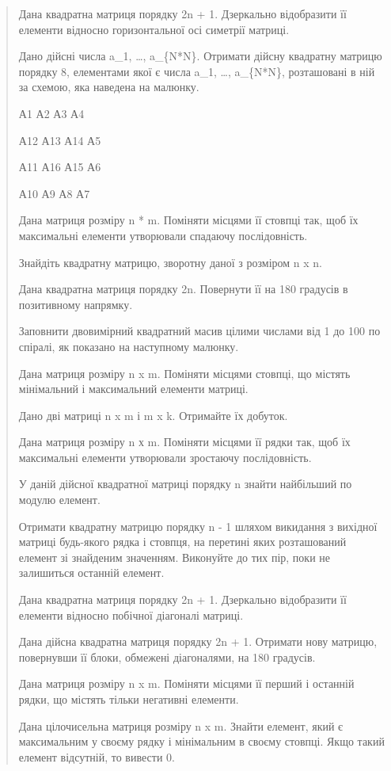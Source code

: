 \documentclass[]{article}
\begin{document}
\begin{quote}
Дана квадратна матриця порядку 2n + 1. Дзеркально відобразити її
елементи відносно горизонтальної осі симетрії матриці.

Дано дійсні числа a\_1, \ldots{}, a\_\{N*N\}. Отримати дійсну квадратну
матрицю порядку 8, елементами якої є числа a\_1, \ldots{}, a\_\{N*N\},
розташовані в ній за схемою, яка наведена на малюнку.

А1 А2 А3 А4

А12 А13 А14 А5

А11 А16 А15 А6

А10 А9 А8 А7

Дана матриця розміру n * m. Поміняти місцями її стовпці так, щоб їх
максимальні елементи утворювали спадаючу послідовність.

Знайдіть квадратну матрицю, зворотну даної з розміром n x n.

Дана квадратна матриця порядку 2n. Повернути її на 180 градусів в
позитивному напрямку.

Заповнити двовимірний квадратний масив цілими числами від 1 до 100 по
спіралі, як показано на наступному малюнку.

Дана матриця розміру n x m. Поміняти місцями стовпці, що містять
мінімальний і максимальний елементи матриці.

Дано дві матриці n x m і m x k. Отримайте їх добуток.

Дана матриця розміру n х m. Поміняти місцями її рядки так, щоб їх
максимальні елементи утворювали зростаючу послідовність.

У даній дійсної квадратної матриці порядку n знайти найбільший по модулю
елемент.

Отримати квадратну матрицю порядку n - 1 шляхом викидання з вихідної
матриці будь-якого рядка і стовпця, на перетині яких розташований
елемент зі знайденим значенням. Виконуйте до тих пір, поки не залишиться
останній елемент.

Дана квадратна матриця порядку 2n + 1. Дзеркально відобразити її
елементи відносно побічної діагоналі матриці.

Дана дійсна квадратна матриця порядку 2n + 1. Отримати нову матрицю,
повернувши її блоки, обмежені діагоналями, на 180 градусів.

Дана матриця розміру n x m. Поміняти місцями її перший і останній рядки,
що містять тільки негативні елементи.

Дана цілочисельна матриця розміру n x m. Знайти елемент, який є
максимальним у своєму рядку і мінімальним в своєму стовпці. Якщо такий
елемент відсутній, то вивести 0.


\end{quote}
\end{document}
